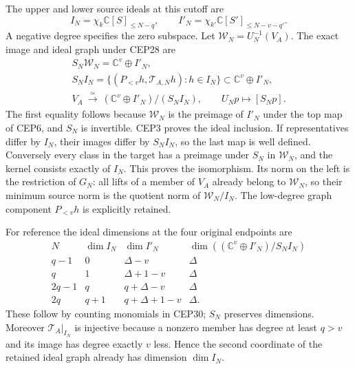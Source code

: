 \documentclass[11pt,a4paper]{article}
\begin{document}
The upper and lower source ideals at this cutoff are
\[
 I_N=\chi_k\mathbb C[S]_{\le N-q},\qquad
 I'_N=\chi_{k'}\mathbb C[S']_{\le N-v-q'} .
 \tag{CEP30}
\]
A negative degree specifies the zero subspace.
Let $\mathcal W_N=U_N^{-1}(V_A)$. The exact image and ideal graph
under CEP28 are
\[
 \begin{gathered}
 S_N\mathcal W_N=\mathbb C^v\oplus I'_N,\\
 S_N I_N=\{(P_{<v}h,\mathcal T_{A,N}h):h\in I_N\}
                    \subset\mathbb C^v\oplus I'_N,\\
 V_A\ \xrightarrow{\ \simeq\ }\
   (\mathbb C^v\oplus I'_N)/(S_N I_N),\qquad
 U_Np\longmapsto[S_Np].
 \end{gathered}\tag{CEP31}
\]
The first equality follows because $\mathcal W_N$ is the preimage
of $I'_N$ under the top map of CEP6, and $S_N$ is invertible.
CEP3 proves the ideal inclusion. If representatives differ by
$I_N$, their images differ by $S_NI_N$, so the last map is
well defined. Conversely every class in the target has a preimage
under $S_N$ in $\mathcal W_N$, and the kernel consists exactly
of $I_N$. This proves the isomorphism. Its norm on the left is
the restriction of $G_N$: all lifts of a member of $V_A$ already
belong to $\mathcal W_N$, so their minimum source norm is the
quotient norm of $\mathcal W_N/I_N$.
The low-degree graph component $P_{<v}h$ is explicitly retained.

For reference the ideal dimensions at the four original endpoints are
\[
 \begin{array}{c|c|c|c}
 N&\dim I_N&\dim I'_N&
       \dim((\mathbb C^v\oplus I'_N)/S_NI_N)\\ \hline
 q-1&0&\Delta-v&\Delta\\
 q&1&\Delta+1-v&\Delta\\
 2q-1&q&q+\Delta-v&\Delta\\
 2q&q+1&q+\Delta+1-v&\Delta .
 \end{array}\tag{CEP32}
\]
These follow by counting monomials in CEP30; $S_N$ preserves
dimensions. Moreover $\mathcal T_A|_{I_N}$ is injective because
a nonzero member has degree at least $q>v$ and its image has
degree exactly $v$ less. Hence the second coordinate of the
retained ideal graph already has dimension $\dim I_N$.
\end{document}
